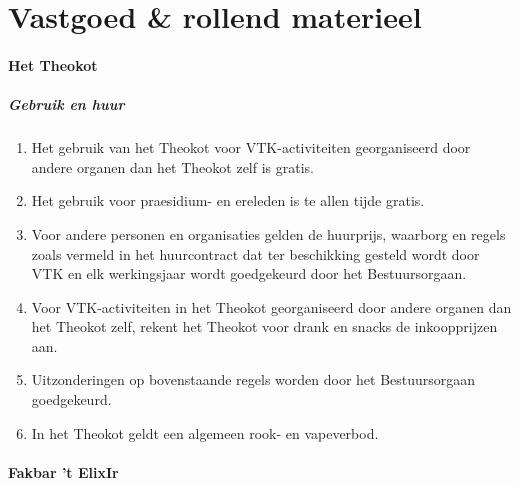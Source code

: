\part{Vastgoed \& rollend materieel}

\subsection{Het Theokot}\label{sec:Theokot}

    \subsubsection{Gebruik en huur}
    \begin{enumerate}
    \item Het gebruik van het Theokot voor VTK-activiteiten georganiseerd door andere organen dan het Theokot zelf is gratis. 
    \item Het gebruik voor praesidium- en ereleden is te allen tijde gratis. \item Voor andere personen en organisaties gelden de huurprijs, waarborg en regels zoals vermeld in het huurcontract dat ter beschikking gesteld wordt door VTK en elk werkingsjaar wordt goedgekeurd door het Bestuursorgaan.
    \item Voor VTK-activiteiten in het Theokot georganiseerd door andere organen dan het Theokot zelf, rekent het Theokot voor drank en snacks de inkoopprijzen aan.
    \item Uitzonderingen op bovenstaande regels worden door het Bestuursorgaan goedgekeurd.
    \item In het Theokot geldt een algemeen rook- en vapeverbod.
    \end{enumerate}

\subsection{Fakbar 't ElixIr}\label{sec:Elixir}

